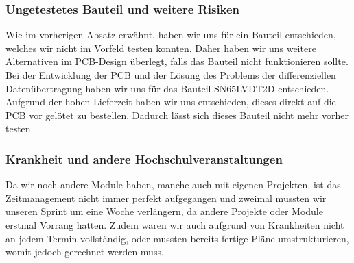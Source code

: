 \subsubsection{Ungetestetes Bauteil und weitere Risiken}
Wie im vorherigen Absatz erwähnt, haben wir uns für ein Bauteil entschieden, welches wir nicht im Vorfeld testen konnten. Daher haben wir uns weitere Alternativen im PCB-Design überlegt, falls das Bauteil nicht funktionieren sollte. Bei der Entwicklung der PCB und der Lösung des Problems der differenziellen Datenübertragung haben wir uns für das Bauteil SN65LVDT2D entschieden. Aufgrund der hohen Lieferzeit haben wir uns entschieden, dieses direkt auf die PCB vor gelötet zu bestellen. Dadurch lässt sich dieses Bauteil nicht mehr vorher testen. 

\subsubsection{Krankheit und andere Hochschulveranstaltungen}
Da wir noch andere Module haben, manche auch mit eigenen Projekten, ist das Zeitmanagement nicht immer perfekt aufgegangen und zweimal mussten wir unseren Sprint um eine Woche verlängern, da andere Projekte oder Module erstmal Vorrang hatten. Zudem waren wir auch aufgrund von Krankheiten nicht an jedem Termin vollständig, oder mussten bereits fertige Pläne umstrukturieren, womit jedoch gerechnet werden muss.


